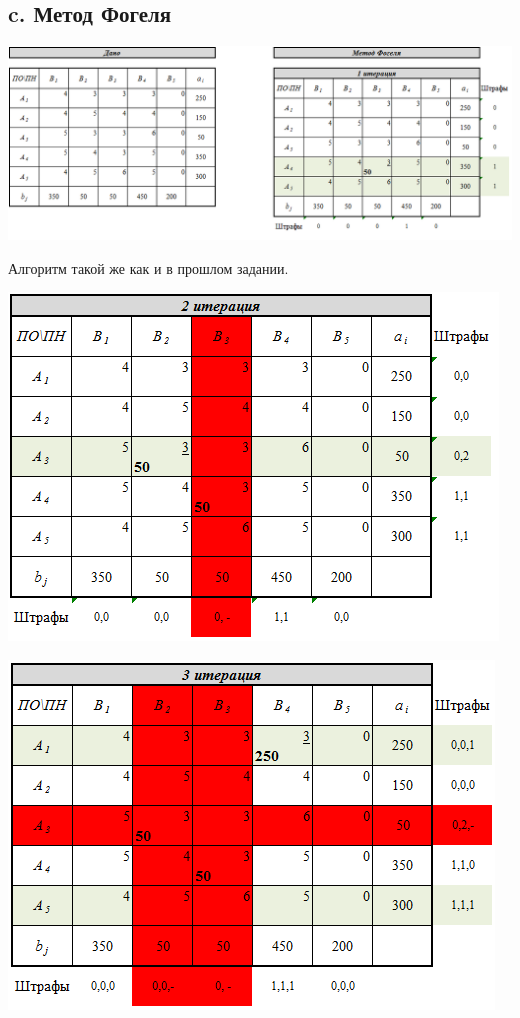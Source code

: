 \documentclass[14pt,a4paper,fleqn]{extarticle}
\begin{document}
\subsection*{c. Метод Фогеля}
\begin{center}
	\includegraphics[scale=0.45]{24}
\end{center}
Алгоритм такой же как и в прошлом задании.\\
\begin{center}
	\includegraphics[scale=0.7]{25}
\end{center}
\newpage
\begin{center}
	\includegraphics[scale=0.7]{26}
\end{center}
\end{document}
